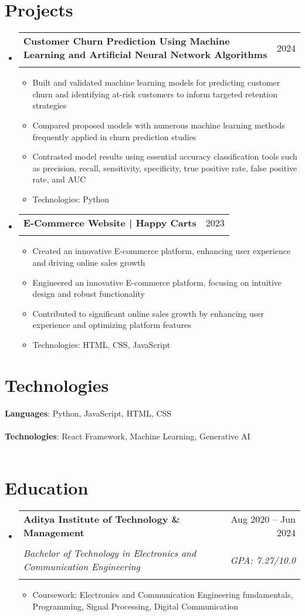 \documentclass[letterpaper,9pt]{article}
\makeatletter
\newcommand{\resumeItem}[1]{
  \item\small{
    {#1 \vspace{-2pt}}
  }
}
\newcommand{\resumeSubheading}[4]{
  \vspace{-2pt}\item
    \begin{tabular*}{0.97\textwidth}[t]{l@{\extracolsep{\fill}}r}
      \textbf{#1} & #2 \\\\
      \textit{\small#3} & \textit{\small #4} \\\\
    \end{tabular*}\vspace{-7pt}
}
\newcommand{\resumeProjectHeading}[2]{
    \item
    \begin{tabular*}{0.97\textwidth}{l@{\extracolsep{\fill}}r}
      \small#1 & #2 \\\\
    \end{tabular*}\vspace{-7pt}
}
\newcommand{\resumeSubHeadingListStart}{\begin{itemize}[leftmargin=0.15in, label={}]}
\newcommand{\resumeSubHeadingListEnd}{\end{itemize}}
\newcommand{\resumeItemListStart}{\begin{itemize}}
\newcommand{\resumeItemListEnd}{\end{itemize}\vspace{-5pt}}
\makeatother
\begin{document}
\section{Projects}
    \resumeSubHeadingListStart
      \resumeProjectHeading
          {\textbf{Customer Churn Prediction Using Machine Learning and Artificial Neural Network Algorithms}}{2024}
          \resumeItemListStart
            \resumeItem{Built and validated machine learning models for predicting customer churn and identifying at-risk customers to inform targeted retention strategies}
            \resumeItem{Compared proposed models with numerous machine learning methods frequently applied in churn prediction studies}
            \resumeItem{Contrasted model results using essential accuracy classification tools such as precision, recall, sensitivity, specificity, true positive rate, false positive rate, and AUC}
            \resumeItem{Technologies: Python}
          \resumeItemListEnd
          
      \resumeProjectHeading
          {\textbf{E-Commerce Website | Happy Carts}}{2023}
          \resumeItemListStart
            \resumeItem{Created an innovative E-commerce platform, enhancing user experience and driving online sales growth}
            \resumeItem{Engineered an innovative E-commerce platform, focusing on intuitive design and robust functionality}
            \resumeItem{Contributed to significant online sales growth by enhancing user experience and optimizing platform features}
            \resumeItem{Technologies: HTML, CSS, JavaScript}
          \resumeItemListEnd
    \resumeSubHeadingListEnd

\section{Technologies}
 \begin{itemize}[leftmargin=0.15in, label={}]
    \small{\item{
     \textbf{Languages}{: Python, JavaScript, HTML, CSS} \\\\
     \textbf{Technologies}{: React Framework, Machine Learning, Generative AI} \\\\
    }}
 \end{itemize}

\section{Education}
  \resumeSubHeadingListStart
    \resumeSubheading
      {Aditya Institute of Technology \& Management}{Aug 2020 -- Jun 2024}
      {Bachelor of Technology in Electronics and Communication Engineering}{GPA: 7.27/10.0}
      \resumeItemListStart
        \resumeItem{Coursework: Electronics and Communication Engineering fundamentals, Programming, Signal Processing, Digital Communication}
      \resumeItemListEnd
  \resumeSubHeadingListEnd
\end{document}
